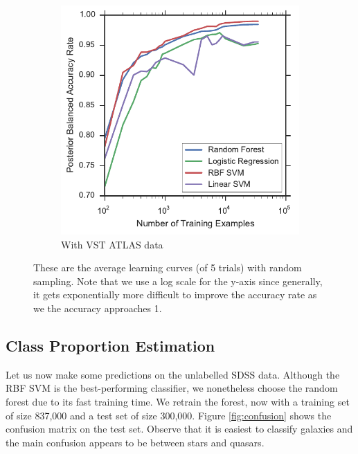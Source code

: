 \begin{figure}[tbp]
\begin{subfigure}{.5\textwidth}
		\includegraphics[width=0.99\linewidth]{figures/4_expt1/vstatlas_learning_curves}
		\caption{With VST ATLAS data}
		\label{fig:vstatlas_learning_curves}
	\end{subfigure}
	\caption[Learning curves with random sampling]{
		These are the average learning curves (of 5 trials) with random sampling.
		Note that we use a log scale for the y-axis since generally, it gets exponentially
		more difficult to improve the accuracy rate as we the accuracy approaches 1.}
	\label{fig:learning_curves}
\end{figure}



\subsection{Class Proportion Estimation}
Let us now make some predictions on the unlabelled SDSS data. Although the RBF SVM is
the best-performing classifier, we nonetheless choose the random forest due to its fast
training time. We retrain the forest, now with a training set of size 837,000 and a test
set of size 300,000. Figure \ref{fig:confusion} shows the confusion matrix on the test set.
Observe that it is easiest to classify galaxies and the main confusion appears to be
between stars and quasars.

